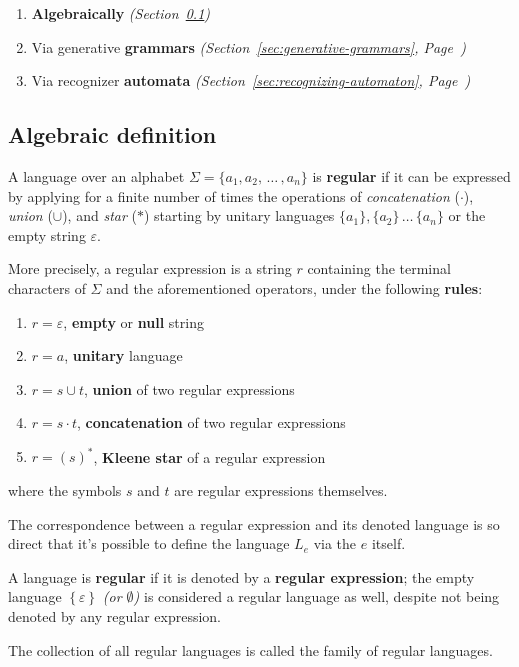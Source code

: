 \documentclass[english]{article}
\begin{document}
\begin{enumerate}
  \item \textbf{Algebraically} \textit{(Section~\ref{sec:reglang-algebraic})}
  \item Via generative \textbf{grammars} \textit{(Section~\ref{sec:generative-grammars}, Page~\pageref{sec:generative-grammars})}
  \item Via recognizer \textbf{automata} \textit{(Section~\ref{sec:recognizing-automaton}, Page~\pageref{sec:recognizing-automaton})}
\end{enumerate}

\subsection{Algebraic definition}
\label{sec:reglang-algebraic}

A language over an alphabet \(\Sigma = \{a_1, a_2, \,\ldots\,, a_n\}\) is \textbf{regular} if it can be expressed by applying for a finite number of times the operations of \textit{concatenation} (\(\cdot\)), \textit{union} (\(\cup\)), and \textit{star} (\(\ast\)) starting by unitary languages \(\{a_1\}, \{a_2\} \,\ldots\, \{a_n\}\) or the empty string \(\varepsilon\).

More precisely, a regular expression is a string \(r\) containing the terminal characters of \(\Sigma\) and the aforementioned operators, under the following \textbf{rules}:

\begin{enumerate}
  \item \(r = \varepsilon\), \textbf{empty} or \textbf{null} string
  \item \(r = a\), \textbf{unitary} language
  \item \(r = s \cup t\), \textbf{union} of two regular expressions
  \item \(r = s \cdot t\), \textbf{concatenation} of two regular expressions
  \item \(r = (s)^\ast\), \textbf{Kleene star} of a regular expression
\end{enumerate}

where the symbols \(s\) and \(t\) are regular expressions themselves.

\bigskip
The correspondence between a regular expression and its denoted language is so direct that it's possible to define the language \(L_e\) via the \re \(e\) itself.

\begin{definition}
  A language is \textbf{regular} if it is denoted by a \textbf{regular expression};
  the empty language \(\left\{ \varepsilon \right\}\) \textit{(or \(\emptyset\))} is considered a regular language as well, despite not being denoted by any regular expression.

  The collection of all regular languages is called the family \REG of regular languages.
\end{definition}
\end{document}
